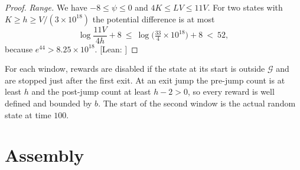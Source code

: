 \documentclass[11pt,letterpaper]{article}
\theoremstyle{plain}
\theoremstyle{definition}
\theoremstyle{remark}
\numberwithin{equation}{section}
\newcommand{\evid}[1]{{\normalfont\small\textsf{[}#1\textsf{]}}}
\begin{document}
\begin{proof}
\emph{Range.} We have $-8\le\psi\le0$ and $4K\le LV\le11V$. For two states with $K\ge h\ge V/(3\times10^{18})$ the potential difference is at most
\[
 \log\frac{11V}{4h}+8\ \le\ \log\bigl(\tfrac{33}4\times10^{18}\bigr)+8\ <\ 52,
\]
because $e^{44}>8.25\times10^{18}$. \evid{Lean: }
\end{proof}
For each window, rewards are disabled if the state at its start is outside $\mathcal G$ and are stopped just after the first exit. At an exit jump the pre-jump count is at least $h$ and the post-jump count at least $h-2>0$, so every reward is well defined and bounded by $b$. The start of the second window is the actual random state at time $100$.

\section{Assembly}\label{sec:assembly}
\end{document}
